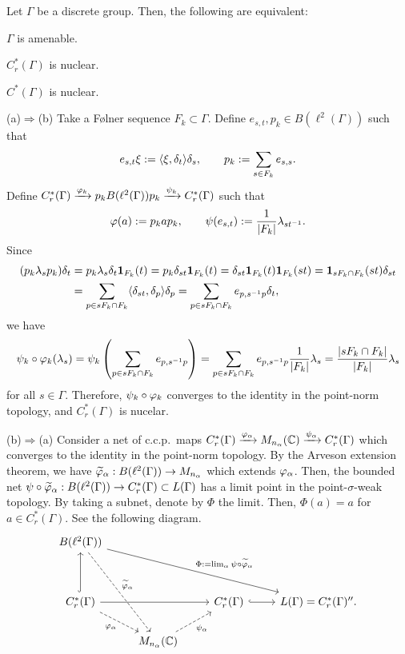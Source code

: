 \documentclass{../../small}
\begin{document}
\begin{thm}[Nuclearity]
Let $\Gamma$ be a discrete group.
Then, the following are equivalent:
\begin{parts}
\item $\Gamma$ is amenable.
\item $C_r^*(\Gamma)$ is nuclear.
\item $C^*(\Gamma)$ is nuclear.
\end{parts}
\end{thm}
\begin{pf}
(a)$\Rightarrow$(b)
Take a F\o lner sequence $F_k\subset\Gamma$.
Define $e_{s,t},p_k\in B(\ell^2(\Gamma))$ such that
\[e_{s,t}\xi:=\langle\xi,\delta_t\rangle\delta_s,\qquad p_k:=\sum_{s\in F_k}e_{s,s}.\]
Define $C_r^*(\Gamma)\xrightarrow{\varphi_k}p_kB(\ell^2(\Gamma))p_k\xrightarrow{\psi_k}C_r^*(\Gamma)$ such that
\[\varphi(a):=p_kap_k,\qquad\psi(e_{s,t}):=\frac1{|F_k|}\lambda_{st^{-1}}.\]
Since
\begin{align*}
(p_k\lambda_sp_k)\delta_t
&=p_k\lambda_s\delta_t\mathbf{1}_{F_k}(t)
=p_k\delta_{st}\mathbf{1}_{F_k}(t)
=\delta_{st}\mathbf{1}_{F_k}(t)\mathbf{1}_{F_k}(st)
=\mathbf{1}_{sF_k\cap F_k}(st)\delta_{st}\\
&=\sum_{p\in sF_k\cap F_k}\langle\delta_{st},\delta_p\rangle\delta_p
=\sum_{p\in sF_k\cap F_k}e_{p,s^{-1}p}\delta_t,
\end{align*}
we have
\[\psi_k\circ\varphi_k(\lambda_s)=\psi_k\left(\sum_{p\in sF_k\cap F_k}e_{p,s^{-1}p}\right)=\sum_{p\in sF_k\cap F_k}e_{p,s^{-1}p}\frac1{|F_k|}\lambda_s=\frac{|sF_k\cap F_k|}{|F_k|}\lambda_s\]
for all $s\in\Gamma$.
Therefore, $\psi_k\circ\varphi_k$ converges to the identity in the point-norm topology, and $C_r^*(\Gamma)$ is nucelar.

(b)$\Rightarrow$(a)
Consider a net of c.c.p.~maps $C_r^*(\Gamma)\xrightarrow{\varphi_\alpha}M_{n_\alpha}(\mathbb{C})\xrightarrow{\psi_\alpha}C_r^*(\Gamma)$ which converges to the identity in the point-norm topology.
By the Arveson extension theorem, we have $\widetilde{\varphi}_\alpha:B(\ell^2(\Gamma))\to M_{n_\alpha}$ which extends $\varphi_\alpha$.
Then, the bounded net $\psi\circ\widetilde{\varphi}_\alpha:B(\ell^2(\Gamma))\to C_r^*(\Gamma)\subset L(\Gamma)$ has a limit point in the point-$\sigma$-weak topology.
By taking a subnet, denote by $\Phi$ the limit.
Then, $\Phi(a)=a$ for $a\in C_r^*(\Gamma)$.
See the following diagram.
\[\begin{tikzcd}
B(\ell^2(\Gamma)) \ar[dashed]{rddd}{\tilde\f_\alpha}\ar{rrrdd}{\Phi:=\lim_\alpha\psi\circ\tilde\f_\alpha}&&&\\
&&&\\
C_r^*(\Gamma)\ar{rr}\ar[swap,dashed]{rd}{\f_\alpha}\ar[hook]{uu}&&C_r^*(\Gamma)\ar[hook]{r}&L(\Gamma)=C_r^*(\Gamma)''.\\
&M_{n_\alpha}(\C)\ar[swap,dashed]{ur}{\psi_\alpha}&&
\end{tikzcd}\]


\end{pf}
\end{document}

